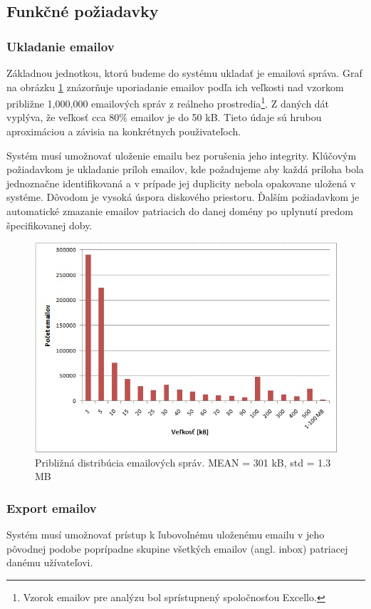 \documentclass[11pt,twoside,a4paper]{book}
\begin{document}
\subsection{Funkčné požiadavky}

\subsubsection*{Ukladanie emailov}
Základnou jednotkou, ktorú budeme do systému ukladať je emailová správa. Graf na obrázku \ref{fig:emailHist} znázorňuje uporiadanie emailov podľa ich veľkosti nad vzorkom približne 1,000,000 emailových správ z reálneho prostredia\footnote{Vzorok emailov pre analýzu bol sprístupnený spoločnosťou Excello.}. Z daných dát vyplýva, že veľkosť cca 80\% emailov je do 50 kB. Tieto údaje sú hrubou aproximáciou a závisia na konkrétnych použivateľoch.

Systém musí umožnovať uloženie emailu bez porušenia jeho integrity. Klúčovým požiadavkom je ukladanie príloh emailov, kde požadujeme aby každá príloha bola jednoznačne identifikovaná a v prípade jej duplicity nebola opakovane uložená v systéme. Dôvodom je vysoká úspora diskového priestoru. Ďalším požiadavkom je automatické zmazanie emailov patriacich do danej domény po uplynutí predom špecifikovanej doby.

\begin{figure}[h]
 \centering
 \includegraphics[width=12cm]{./figures/emailsHist.png}
 \caption{Približná distribúcia emailových správ. MEAN = 301 kB, std = 1.3 MB}
 \label{fig:emailHist}
\end{figure}


\subsubsection*{Export emailov}
Systém musí umožnovať prístup k ľubovoľnému uloženému emailu v jeho pôvodnej podobe poprípadne skupine všetkých emailov (angl. inbox) patriacej danému užívateľovi.
\end{document}
